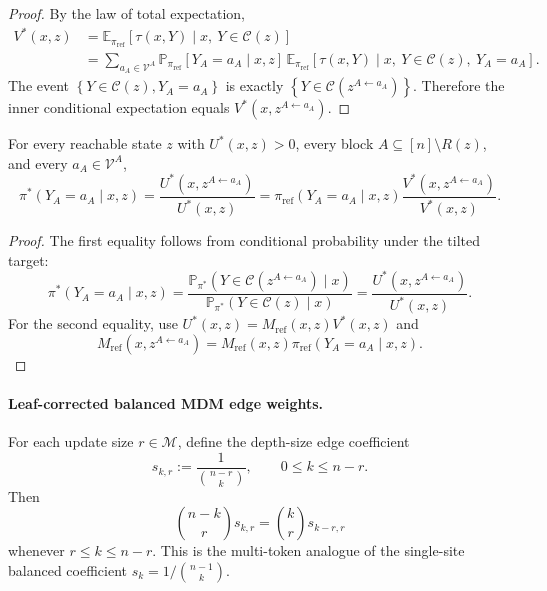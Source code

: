 \documentclass{article}
\numberwithin{theorem}{section}
\numberwithin{proposition}{section}
\numberwithin{corollary}{section}
\numberwithin{lemma}{section}
\numberwithin{conjecture}{section}
\numberwithin{remark}{section}
\numberwithin{definition}{section}
\numberwithin{assumption}{section}
\numberwithin{example}{section}
\newcommand{\calC}{{\mathcal{C}}}
\newcommand{\calM}{{\mathcal{M}}}
\newcommand{\calV}{{\mathcal{V}}}
\newcommand{\bbE}{\mathbb{E}}
\newcommand{\bbP}{\mathbb{P}}
\newcommand{\lbra}[1]{\left[#1\right]}
\newcommand{\mbra}[1]{\left\{#1\right\}}
\providecommand{\base}{\pi_{\mathrm{ref}}}
\begin{document}
\begin{proof}
By the law of total expectation,
\begin{align*}
    V^*(x,z)
    &=\bbE_{\base}\lbra{\tau(x,Y)\mid x,\ Y\in\calC(z)}\\
    &=\sum_{a_A\in\calV^A}\bbP_{\base}\lbra{Y_A=a_A\mid x,z}\,
    \bbE_{\base}\lbra{\tau(x,Y)\mid x,\ Y\in\calC(z),\ Y_A=a_A}.
\end{align*}
The event $\mbra{Y\in\calC(z),Y_A=a_A}$ is exactly $\mbra{Y\in\calC(z^{A\leftarrow a_A})}$. Therefore the inner conditional expectation equals $V^*(x,z^{A\leftarrow a_A})$.
\end{proof}

\begin{proposition}
\label{prop:balanced_mdm_exact_conditional}
For every reachable state $z$ with $U^*(x,z)>0$, every block $A\subseteq\lbra{n}\setminus R(z)$, and every $a_A\in\calV^A$,
\begin{equation*}
    \pi^*(Y_A=a_A\mid x,z)
    =\frac{U^*(x,z^{A\leftarrow a_A})}{U^*(x,z)}
    =\base(Y_A=a_A\mid x,z)\frac{V^*(x,z^{A\leftarrow a_A})}{V^*(x,z)}.
\end{equation*}
\end{proposition}

\begin{proof}
The first equality follows from conditional probability under the tilted target:
\begin{equation*}
    \pi^*(Y_A=a_A\mid x,z)
    =\frac{\bbP_{\pi^*}(Y\in\calC(z^{A\leftarrow a_A})\mid x)}{\bbP_{\pi^*}(Y\in\calC(z)\mid x)}
    =\frac{U^*(x,z^{A\leftarrow a_A})}{U^*(x,z)}.
\end{equation*}
For the second equality, use $U^*(x,z)=M_{\mathrm{ref}}(x,z)V^*(x,z)$ and
\begin{equation*}
    M_{\mathrm{ref}}(x,z^{A\leftarrow a_A})=M_{\mathrm{ref}}(x,z)\base(Y_A=a_A\mid x,z).
\end{equation*}
\end{proof}

\paragraph{Leaf-corrected balanced MDM edge weights.}
For each update size $r\in\calM$, define the depth-size edge coefficient
\begin{equation*}
\label{eq:balanced_mdm_skr}
    s_{k,r}:=\frac{1}{\binom{n-r}{k}},\qquad 0\le k\le n-r.
\end{equation*}
Then
\begin{equation*}
\label{eq:balanced_mdm_skr_identity}
    \binom{n-k}{r}s_{k,r}=\binom{k}{r}s_{k-r,r}
\end{equation*}
whenever $r\le k\le n-r$. This is the multi-token analogue of the single-site balanced coefficient $s_k=1/\binom{n-1}{k}$.
\end{document}
